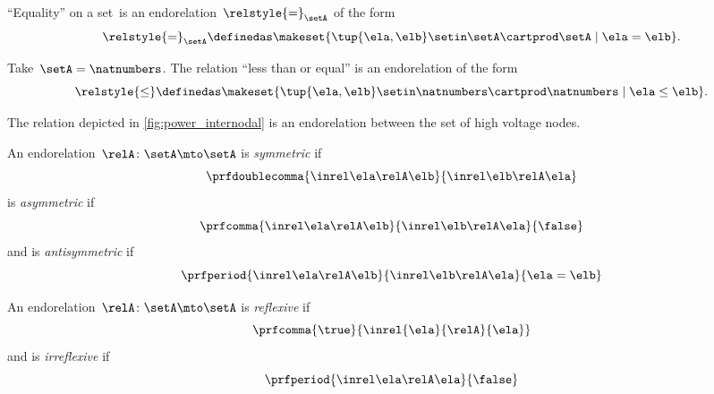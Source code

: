 \begin{example}
    ``Equality'' on a set~\setA is an endorelation~$\relstyle{=}_\setA$ of the form
    \begin{equation}
        \relstyle{=}_\setA \definedas \makeset{\tup{\ela,\elb}\setin \setA\cartprod \setA \mid \ela=\elb}.
    \end{equation}
\end{example}

\begin{example}
    Take~$\setA=\natnumbers$.
    The relation ``less than or equal'' is an endorelation of the form
    \begin{equation}
        \relstyle{\leq} \definedas  \makeset{\tup{\ela,\elb}\setin \natnumbers\cartprod \natnumbers\mid \ela \leq \elb}.
    \end{equation}
\end{example}

\begin{example}
    The relation depicted in \cref{fig:power_internodal} is an endorelation between the set of high voltage nodes.
\end{example}

\begin{ctdefinition}
    \label{def:endo_sym_asym_antisym}
    \label{def:antisymmetry}
    An endorelation~$\relA\colon \setA\mto \setA$ is \emph{symmetric} if
    \begin{equation}
        \prfdoublecomma{
            \inrel \ela \relA \elb
        }{
            \inrel \elb \relA \ela
        }
    \end{equation}
    is \emph{asymmetric} if
    \begin{equation}
        \prfcomma{
            \inrel \ela \relA \elb
        }{
            \inrel \elb \relA \ela
        }{
            \false
        }
    \end{equation}
    and is \emph{antisymmetric} if
    \begin{equation}
        \prfperiod{
            \inrel \ela \relA \elb
        }{
            \inrel \elb \relA \ela
        }{
            \ela = \elb
        }
    \end{equation}
\end{ctdefinition}

\begin{ctdefinition}
    \label{def:endo_reflexive_irreflexive}
    An endorelation~$\relA\colon \setA\mto \setA$ is \emph{reflexive} if
    \begin{equation}
        \prfcomma{\true}{\inrel{\ela}{\relA}{\ela}}
    \end{equation}
    and is \emph{irreflexive} if
    \begin{equation}
        \prfperiod{
            \inrel \ela \relA \ela
        }{
            \false
        }
    \end{equation}
\end{ctdefinition}

